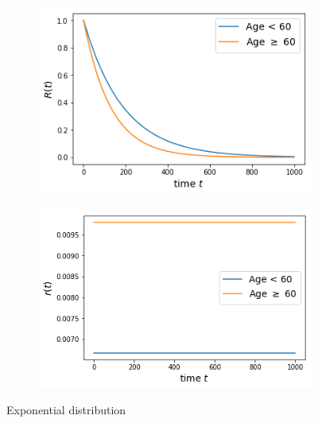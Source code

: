 \documentclass[10pt]{article}
\begin{document}
  \begin{figure}[htb!]
\centering
    \begin{subfigure}{.4\linewidth}
    \centering
    \includegraphics[width=.99\textwidth]{Images/age/Sexp.png}
  \end{subfigure}%
    \begin{subfigure}{.4\linewidth}
    \centering
    \includegraphics[width=.99\textwidth]{Images/age/rexp.png}
  \end{subfigure}%
  \caption{Exponential distribution}\label{fig:karexp} 
   \end{figure}   
   
\end{document}
